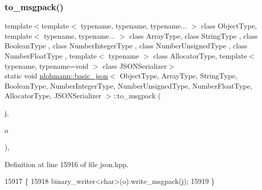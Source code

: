 \subsubsection{\texorpdfstring{to\+\_\+msgpack()}{to\_msgpack()}\hspace{0.1cm}{\footnotesize\ttfamily [3/3]}}
{\footnotesize\ttfamily template$<$template$<$ typename, typename, typename... $>$ class Object\+Type, template$<$ typename, typename... $>$ class Array\+Type, class String\+Type , class Boolean\+Type , class Number\+Integer\+Type , class Number\+Unsigned\+Type , class Number\+Float\+Type , template$<$ typename $>$ class Allocator\+Type, template$<$ typename, typename=void $>$ class J\+S\+O\+N\+Serializer$>$ \\
static void \hyperlink{classnlohmann_1_1basic__json}{nlohmann\+::basic\+\_\+json}$<$ Object\+Type, Array\+Type, String\+Type, Boolean\+Type, Number\+Integer\+Type, Number\+Unsigned\+Type, Number\+Float\+Type, Allocator\+Type, J\+S\+O\+N\+Serializer $>$\+::to\+\_\+msgpack (\begin{DoxyParamCaption}\item[{const \hyperlink{classnlohmann_1_1basic__json}{basic\+\_\+json}$<$ Object\+Type, Array\+Type, String\+Type, Boolean\+Type, Number\+Integer\+Type, Number\+Unsigned\+Type, Number\+Float\+Type, Allocator\+Type, J\+S\+O\+N\+Serializer $>$ \&}]{j,  }\item[{\hyperlink{classnlohmann_1_1detail_1_1output__adapter}{detail\+::output\+\_\+adapter}$<$ char $>$}]{o }\end{DoxyParamCaption})\hspace{0.3cm}{\ttfamily [inline]}, {\ttfamily [static]}}



Definition at line 15916 of file json.\+hpp.


\begin{DoxyCode}
15917     \{
15918         binary\_writer<char>(o).write\_msgpack(j);
15919     \}
\end{DoxyCode}
\mbox{\label{classnlohmann_1_1basic__json_ae1ece6c2059114eac10873f13ef19185}} 
